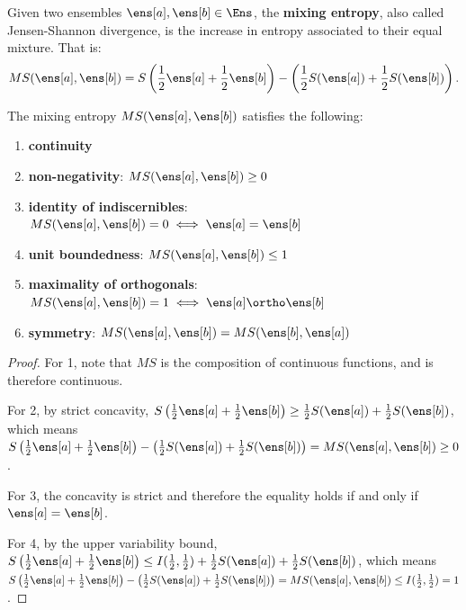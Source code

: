 \begin{mathSection}
\begin{defn}
	Given two ensembles $\ens[a], \ens[b] \in \Ens$, the \textbf{mixing entropy}, also called Jensen-Shannon divergence, is the increase in entropy associated to their equal mixture. That is:
	$$MS(\ens[a], \ens[b]) = S\left(\frac{1}{2}\ens[a] + \frac{1}{2} \ens[b]\right) - \left(\frac{1}{2} S(\ens[a]) + \frac{1}{2} S(\ens[b])\right).$$
\end{defn}

\begin{prop}
	The mixing entropy $MS(\ens[a], \ens[b])$ satisfies the following:
	\begin{enumerate}
		\item \textbf{continuity}
		\item \textbf{non-negativity}: $MS(\ens[a], \ens[b]) \geq 0$
		\item \textbf{identity of indiscernibles}: $MS(\ens[a], \ens[b]) = 0 \iff \ens[a]=\ens[b]$
		\item \textbf{unit boundedness}: $MS(\ens[a], \ens[b]) \leq 1$
		\item \textbf{maximality of orthogonals}: $MS(\ens[a], \ens[b]) = 1 \iff \ens[a] \ortho \ens[b]$
		\item \textbf{symmetry}: $MS(\ens[a], \ens[b]) = MS(\ens[b], \ens[a])$
	\end{enumerate}
\end{prop}

\begin{proof}
	For 1, note that $MS$ is the composition of continuous functions, and is therefore continuous.
	
	For 2, by strict concavity, $S\left(\frac{1}{2} \ens[a] + \frac{1}{2} \ens[b]\right) \geq \frac{1}{2} S(\ens[a]) + \frac{1}{2} S(\ens[b])$, which means $S\left(\frac{1}{2} \ens[a] + \frac{1}{2} \ens[b]\right) - \left(\frac{1}{2} S(\ens[a]) + \frac{1}{2} S(\ens[b])\right) = MS(\ens[a], \ens[b]) \geq 0$.
	
	For 3, the concavity is strict and therefore the equality holds if and only if $\ens[a] = \ens[b]$.
	
	For 4, by the upper variability bound, $S\left(\frac{1}{2} \ens[a] + \frac{1}{2} \ens[b]\right) \leq I(\frac{1}{2}, \frac{1}{2}) + \frac{1}{2} S(\ens[a]) + \frac{1}{2} S(\ens[b])$, which means $S\left(\frac{1}{2} \ens[a] + \frac{1}{2} \ens[b]\right) - \left(\frac{1}{2} S(\ens[a]) + \frac{1}{2} S(\ens[b])\right) = MS(\ens[a], \ens[b]) \leq I(\frac{1}{2}, \frac{1}{2}) = 1$.
	

\end{proof}
\end{mathSection}

